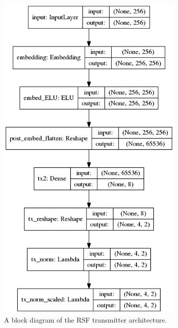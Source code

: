 \documentclass[12pt,onecolumn,letterpaper]{article}
\begin{document}
\begin{figure}[t!]
   \centering
  \begin{subfigure}[t]{0.3\textwidth}
       \centering
       \includegraphics[width=\linewidth]{figures/aoudia_paper/transmitter_rsf_arch.png}
       \caption{A block diagram of the RSF transmitter architecture.}
       \label{fig:RsfTxArch}
   \end{subfigure}
   ~
   \begin{subfigure}[t]{0.3\textwidth}

\end{subfigure}
\end{figure}
\end{document}
